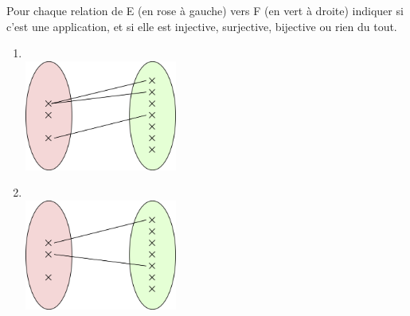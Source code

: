 \begin{exercice}[]
    Pour chaque relation de E (en rose à gauche) vers F (en vert à droite) indiquer si c'est une application, et si elle est injective, surjective, bijective ou rien du tout.
    \def\myw{5cm}
    \begin{multicols}{2}
        \begin{enumerate}
            \item 	\ \\\includegraphics[width=\myw]{ensembles/img/1.png}
            \item 	\ \\\includegraphics[width=\myw]{ensembles/img/2.png}

\end{enumerate}
\end{multicols}
\end{exercice}
